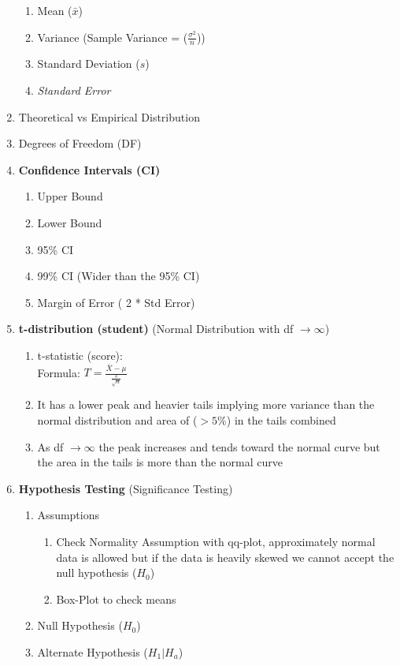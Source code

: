 \documentclass[11pt]{article}
\begin{document}
\begin{enumerate}
\begin{enumerate}
			\item Mean ($\bar{x}$)
			\item Variance (Sample Variance = ($ \frac{\sigma^2}{n} $))
			\item Standard Deviation ($s$)
			\item \textit{Standard Error}
		\end{enumerate}
		\item Theoretical vs Empirical Distribution
		\item Degrees of Freedom (DF)
		\item \textbf{Confidence Intervals (CI)}
		\begin{enumerate}
			\item Upper Bound
			\item Lower Bound
			\item 95\% CI
			\item 99\% CI (Wider than the 95\% CI)
			\item Margin of Error ( 2 * Std Error)
		\end{enumerate}
		\item \textbf{t-distribution (student)} (Normal Distribution with df $ \to \infty$)
		\begin{enumerate}
			\item t-statistic (score):\\
			Formula: 
			$T = \frac{ \bar{X} - \mu}{ \frac{s}{\sqrt{n}} }$
			\item It has a lower peak and heavier tails implying more variance than the normal distribution and area of ($> 5\%$) in the tails combined
			\item As df $\to \infty$ the peak increases and tends toward the normal curve but the area in the tails is more than the normal curve
		\end{enumerate}
		\item \textbf{Hypothesis Testing} (Significance Testing)
		\begin{enumerate}
			\item Assumptions
			\begin{enumerate}
				\item Check Normality Assumption with qq-plot, approximately normal data is allowed but if the data is heavily skewed we cannot accept the null hypothesis ($H_0$)
				\item Box-Plot to check means
			\end{enumerate}
			\item Null Hypothesis ($H_0$) 
			\item Alternate Hypothesis ($H_1 | H_a$)

\end{enumerate}
\end{enumerate}
\end{document}
